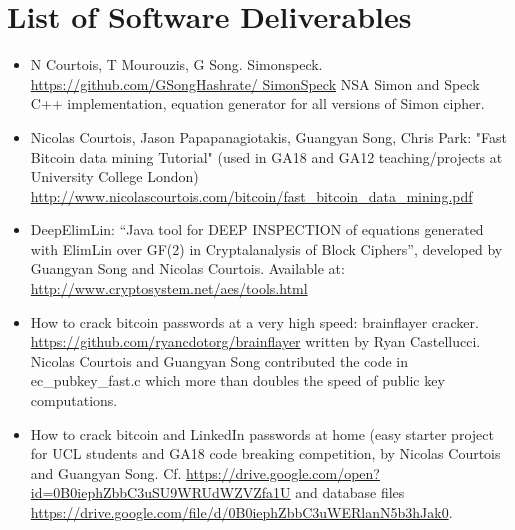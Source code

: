 \documentclass[12pt,phd,a4paper,oneside]{ucl_thesis}
\begin{document}
\chapter*{List of Software Deliverables}
\begin{itemize}
	\item  N Courtois, T Mourouzis, G Song. Simonspeck. \url{https://github.com/GSongHashrate/ SimonSpeck}
	NSA Simon and Speck C++ implementation, equation generator for all versions of Simon cipher.
	\item Nicolas Courtois, Jason Papapanagiotakis, Guangyan Song, Chris Park:
	"Fast Bitcoin data mining Tutorial" (used in GA18 and GA12 teaching/projects at University College London)
	\url{http://www.nicolascourtois.com/bitcoin/fast_bitcoin_data_mining.pdf}
	\item DeepElimLin: 
	``Java tool for DEEP INSPECTION of equations generated with ElimLin over GF(2)
	in Cryptalanalysis of Block Ciphers'', developed by Guangyan Song and Nicolas Courtois.
	Available at:
	\url{http://www.cryptosystem.net/aes/tools.html}
	\item How to crack bitcoin passwords at a very high speed: brainflayer cracker.
	\url{https://github.com/ryancdotorg/brainflayer} written by Ryan Castellucci. Nicolas
	Courtois and Guangyan Song contributed the code in ec\_pubkey\_fast.c
	which more than doubles the speed of public key computations. 
	
	\item How to crack bitcoin and LinkedIn passwords at home 
	(easy starter project for UCL students and GA18 code breaking competition, 
	by Nicolas Courtois and Guangyan Song. Cf. 
	\url{https://drive.google.com/open?id=0B0iephZbbC3uSU9WRUdWZVZfa1U}
	and database files \url{https://drive.google.com/file/d/0B0iephZbbC3uWERlanN5b3hJak0}. 
\end{itemize}











 


%



\end{document}

